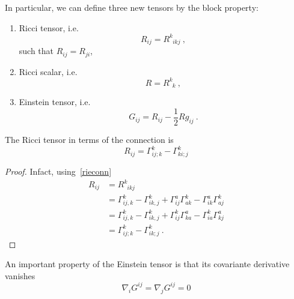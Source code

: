     In particular, we can define three new tensors by the block property: 
    \begin{enumerate}
        \item Ricci tensor, i.e. 
            \begin{equation}\label{riccit}
                R_{ij} = R^k_{\phantom k ikj} ~,
            \end{equation}
            such that $R_{ij} = R_{ji}$,
        \item Ricci scalar, i.e. 
            \begin{equation}\label{riccis}
                R = R^k_{\phantom k k} ~,
            \end{equation}
        \item Einstein tensor, i.e. 
            \begin{equation}\label{einstens}
                G_{ij} = R_{ij} - \frac{1}{2} R g_{ij} ~.
            \end{equation}
    \end{enumerate}
    The Ricci tensor in terms of the connection is 
    \begin{equation*}
        R_{ij} = \Gamma^k_{ij;k} - \Gamma^k_{ki;j}
    \end{equation*}
    \begin{proof}
        Infact, using~\eqref{rieconn}
        \begin{equation*}
        \begin{aligned}
            R_{ij} & = R^k_{\phantom k ikj} \\ &  = \Gamma^k_{ij,k} - \Gamma^k_{ik,j} + \Gamma^a_{ij} \Gamma^k_{ak} - \Gamma^a_{ik} \Gamma^k_{aj} \\ & = \Gamma^k_{ij,k} - \Gamma^k_{ik,j} + \Gamma^k_{ij} \Gamma^a_{ka} - \Gamma^k_{ia} \Gamma^a_{kj} \\ & = \Gamma^k_{ij;k} - \Gamma^k_{ik;j} ~.
        \end{aligned}
        \end{equation*}
    \end{proof}
    An important property of the Einstein tensor is that its covariante derivative vanishes 
    \begin{equation*}
        \nabla_i G^{ij} = \nabla_j G^{ij} = 0
    \end{equation*}
